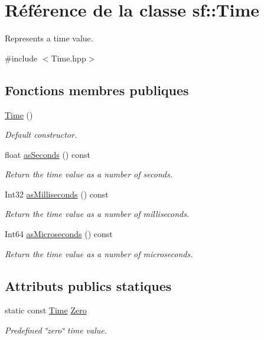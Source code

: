 \hypertarget{classsf_1_1Time}{}\section{Référence de la classe sf\+:\+:Time}
\label{classsf_1_1Time}


Represents a time value.  




{\ttfamily \#include $<$Time.\+hpp$>$}

\subsection*{Fonctions membres publiques}
\begin{DoxyCompactItemize}
\item 
\hyperlink{classsf_1_1Time_acba0cfbc49e3a09a22a8e079eb67a05c}{Time} ()
\begin{DoxyCompactList}\small\item\em Default constructor. \end{DoxyCompactList}\item 
float \hyperlink{classsf_1_1Time_aa3df2f992d0b0041b4eb02258d43f0e3}{as\+Seconds} () const
\begin{DoxyCompactList}\small\item\em Return the time value as a number of seconds. \end{DoxyCompactList}\item 
Int32 \hyperlink{classsf_1_1Time_aa16858ca030a07eb18958c321f256e5a}{as\+Milliseconds} () const
\begin{DoxyCompactList}\small\item\em Return the time value as a number of milliseconds. \end{DoxyCompactList}\item 
Int64 \hyperlink{classsf_1_1Time_a000c2c64b74658ebd228b9294a464275}{as\+Microseconds} () const
\begin{DoxyCompactList}\small\item\em Return the time value as a number of microseconds. \end{DoxyCompactList}\end{DoxyCompactItemize}
\subsection*{Attributs publics statiques}
\begin{DoxyCompactItemize}
\item 
\mbox{\label{classsf_1_1Time_a8db127b632fa8da21550e7282af11fa0}} 
static const \hyperlink{classsf_1_1Time}{Time} \hyperlink{classsf_1_1Time_a8db127b632fa8da21550e7282af11fa0}{Zero}
\begin{DoxyCompactList}\small\item\em Predefined \char`\"{}zero\char`\"{} time value. \end{DoxyCompactList}\end{DoxyCompactItemize}
